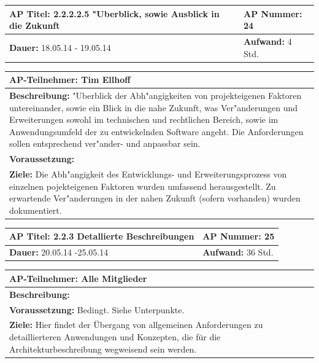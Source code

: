 \documentclass[fontsize=12pt,paper=a4,twoside]{scrartcl}
\begin{document}
\begin{tabular}{|p{7.43cm}|p{7.43cm}|}
\hline
\textbf{AP Titel: }2.2.2.2.5 "Uberblick, sowie Ausblick in die Zukunft & \textbf{AP Nummer: }24\\ 
\hline
\textbf{Dauer: }18.05.14 - 19.05.14 & \textbf{Aufwand: } 4 Std.\\
\hline
\end{tabular}
\begin{tabular}{|p{15.3cm}|}
\hline
\textbf{AP-Teilnehmer: }Tim Ellhoff\\
\hline
\textbf{Beschreibung: }"Uberblick der Abh"angigkeiten von projekteigenen Faktoren untereinander, sowie ein Blick in die nahe Zukunft, was Ver"anderungen und Erweiterungen sowohl im technischen und rechtlichen Bereich, sowie im Anwendungsumfeld der zu entwickelnden Software angeht. Die Anforderungen sollen entsprechend ver"ander-
 und anpassbar sein.\\
\hline
\textbf{Voraussetzung: }\\
\hline 
\textbf{Ziele: }Die Abh"angigkeit des Entwicklungs- und Erweiterungsprozess von einzelnen pojekteigenen Faktoren wurden umfassend herausgestellt. Zu erwartende Ver"anderungen in der nahen Zukunft (sofern vorhanden) wurden dokumentiert.\\
\hline 
\end{tabular}

\begin{tabular}{|p{7.43cm}|p{7.43cm}|}
\hline
\textbf{AP Titel: }2.2.3 Detallierte Beschreibungen & \textbf{AP Nummer: }25\\ 
\hline
\textbf{Dauer: }20.05.14 -25.05.14 & \textbf{Aufwand: } 36 Std.\\
\hline
\end{tabular}
\begin{tabular}{|p{15.3cm}|}
\hline
\textbf{AP-Teilnehmer: }Alle Mitglieder\\
\hline
\textbf{Beschreibung: }\\
\hline
\textbf{Voraussetzung: }Bedingt. Siehe Unterpunkte.\\
\hline 
\textbf{Ziele: } Hier findet der Übergang von allgemeinen Anforderungen zu detaillierteren Anwendungen und Konzepten, die für die Architekturbeschreibung wegweisend sein werden.\\
\hline 
\end{tabular}
\end{document}
